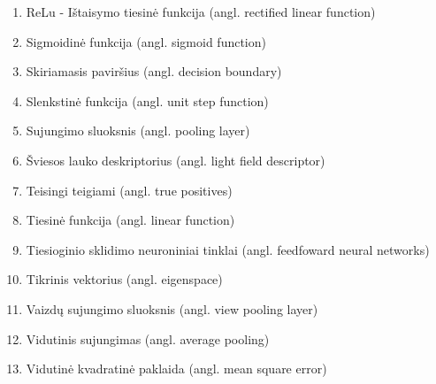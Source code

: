 \begin{enumerate}
	\item ReLu - Ištaisymo tiesinė funkcija (angl. rectified linear function)
	\item Sigmoidinė funkcija (angl. sigmoid function)
	\item Skiriamasis paviršius (angl. decision boundary)
	\item Slenkstinė funkcija (angl. unit step function)
	\item Sujungimo sluoksnis (angl. pooling layer)
	\item Šviesos lauko deskriptorius (angl. light field descriptor)
	\item Teisingi teigiami (angl. true positives)
	\item Tiesinė funkcija (angl. linear function)
	\item Tiesioginio sklidimo neuroniniai tinklai (angl. feedfoward neural networks)
	\item Tikrinis vektorius (angl. eigenspace)
	\item Vaizdų sujungimo sluoksnis (angl. view pooling layer)
	\item Vidutinis sujungimas (angl. average pooling)
	\item Vidutinė kvadratinė paklaida (angl. mean square error)
\end{enumerate}